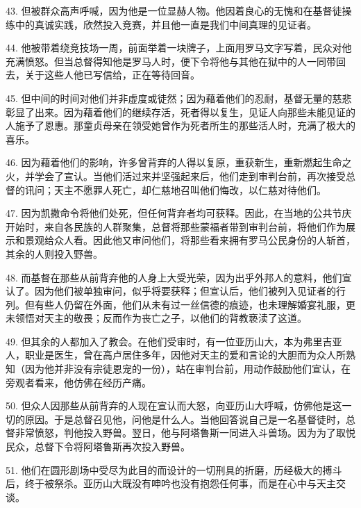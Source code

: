 43. 但被群众高声呼喊，因为他是一位显赫人物。他因着良心的无愧和在基督徒操练中的真诚实践，欣然投入竞赛，并且他一直是我们中间真理的见证者。\par

44. 他被带着绕竞技场一周，前面举着一块牌子，上面用罗马文字写着，民众对他充满愤怒。但当总督得知他是罗马人时，便下令将他与其他在狱中的人一同带回去，关于这些人他已写信给，正在等待回音。\par

45. 但中间的时间对他们并非虚度或徒然；因为藉着他们的忍耐，基督无量的慈悲彰显了出来。因为藉着他们的继续存活，死者得以复生，见证人向那些未能见证的人施予了恩惠。那童贞母亲在领受她曾作为死者所生的那些活人时，充满了极大的喜乐。\par

46. 因为藉着他们的影响，许多曾背弃的人得以复原，重获新生，重新燃起生命之火，并学会了宣认。当他们活过来并坚强起来后，他们走到审判台前，再次接受总督的讯问；天主不愿罪人死亡，却仁慈地召叫他们悔改，以仁慈对待他们。\par

47. 因为凯撒命令将他们处死，但任何背弃者均可获释。因此，在当地的公共节庆开始时，来自各民族的人群聚集，总督将那些蒙福者带到审判台前，将他们作为展示和景观给众人看。因此他又审问他们，将那些看来拥有罗马公民身份的人斩首，其余的人则投入野兽。\par

48. 而基督在那些从前背弃他的人身上大受光荣，因为出乎外邦人的意料，他们宣认了。因为他们被单独审问，似乎将要获释；但宣认后，他们被列入见证者的行列。但有些人仍留在外面，他们从未有过一丝信德的痕迹，也未理解婚宴礼服，更未领悟对天主的敬畏；反而作为丧亡之子，以他们的背教亵渎了这道。\par

49. 但其余的人都加入了教会。在他们受审时，有一位亚历山大，本为弗里吉亚人，职业是医生，曾在高卢居住多年，因他对天主的爱和言论的大胆而为众人所熟知（因为他并非没有宗徒恩宠的一份），站在审判台前，用动作鼓励他们宣认，在旁观者看来，他仿佛在经历产痛。\par

50. 但众人因那些从前背弃的人现在宣认而大怒，向亚历山大呼喊，仿佛他是这一切的原因。于是总督召见他，问他是什么人。当他回答说自己是一名基督徒时，总督非常愤怒，判他投入野兽。翌日，他与阿塔鲁斯一同进入斗兽场。因为为了取悦民众，总督下令将阿塔鲁斯再次投入野兽。\par

51. 他们在圆形剧场中受尽为此目的而设计的一切刑具的折磨，历经极大的搏斗后，终于被祭杀。亚历山大既没有呻吟也没有抱怨任何事，而是在心中与天主交谈。\par

